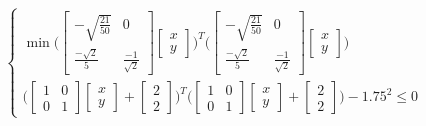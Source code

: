 \documentclass{beamer}
\begin{document}
\begin{frame}
    $$
        \begin{cases}
            \min
                \Bigg(
                    \begin{bmatrix}
                        -\sqrt{\frac{21}{50}} & 0 \\
                        \frac{-\sqrt{2}}{5} & \frac{-1}{\sqrt{2}}
                    \end{bmatrix}
                    \begin{bmatrix}
                        x \\
                        y
                    \end{bmatrix}
                \Bigg) ^ {T}
                \Bigg(
                    \begin{bmatrix}
                        -\sqrt{\frac{21}{50}} & 0 \\
                        \frac{-\sqrt{2}}{5} & \frac{-1}{\sqrt{2}}
                    \end{bmatrix}
                    \begin{bmatrix}
                        x \\
                        y
                    \end{bmatrix}
                \Bigg)
            \\
            \Bigg(
                \begin{bmatrix}
                    1 & 0 \\
                    0 & 1
                \end{bmatrix}
                \begin{bmatrix}
                    x \\
                    y
                \end{bmatrix}
                +
                \begin{bmatrix}
                    2 \\
                    2
                \end{bmatrix}
            \Bigg) ^ {T}
            \Bigg(
                \begin{bmatrix}
                    1 & 0 \\
                    0 & 1
                \end{bmatrix}
                \begin{bmatrix}
                    x \\
                    y
                \end{bmatrix}
                +
                \begin{bmatrix}
                    2 \\
                    2
                \end{bmatrix}
            \Bigg)
            - 1.75 ^ {2} \leq 0
        \end{cases}
    $$
\end{frame}
\end{document}
